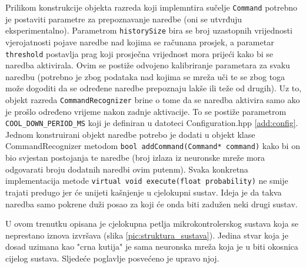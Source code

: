 Prilikom konstrukcije objekta razreda koji implemntira sučelje \texttt{Command} potrebno je postaviti
parametre za prepoznavanje naredbe (oni se utvrđuju eksperimentalno). Parametrom \texttt{historySize}
bira se broj uzastopnih vrijednosti vjerojatnosti pojave naredbe nad kojima se računana prosjek,
a parametar \texttt{threshold} postavlja prag koji prosječna vrijednost mora prijeći kako bi se naredba
aktivirala. Ovim se postiže odvojeno kalibriranje parametara za svaku naredbu (potrebno
je zbog podataka nad kojima se mreža uči te se zbog toga može dogoditi da se određene
naredbe prepoznaju lakše ili teže od drugih).
Uz to, objekt razreda \texttt{CommandRecognizer} brine o tome da se naredba aktivira
samo ako je prošlo određeno vrijeme nakon zadnje aktivacije. To se postiže parametrom 
\texttt{COOL\_DOWN\_PERIOD\_MS} koji je definiran u datoteci Configuration.hpp \ref{add:config}.
Jednom konstruirani objekt naredbe potrebo je dodati 
u objekt klase CommandRecognizer metodom \texttt{bool addCommand(Command* command)} 
kako bi on bio svjestan postojanja te naredbe (broj izlaza iz neuronske mreže mora odgovarati 
broju dodatnih naredbi ovim putenm). Svaka konkretna implementacija metode 
\texttt{virtual void execute(float probability)} ne smije trajati predugo jer će unijeti 
kašnjenje u cjelokupni sustav. Ideja je da takva naredba samo pokrene duži posao za koji će onda
biti zadužen neki drugi sustav.

U ovom trenutku opisana je cjelokupna petlja mikrokontrolerskog sustava
koja se neprestano iznova izvršava (slika \ref{pic:struktura_sustava}).
Jedina stvar koja je dosad uzimana kao "crna kutija" je sama neuronska mreža koja
je u biti okosnica cijelog sustava. Sljedeće poglavlje posvećeno je upravo njoj.
